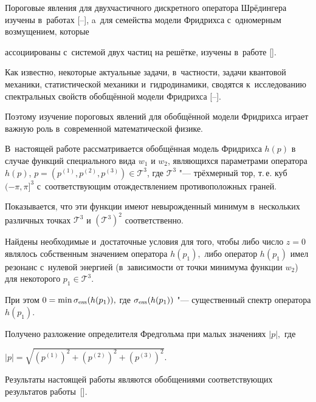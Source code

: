 \maketitle



Пороговые явления для двухчастичного дискретного оператора Шрё\-дин\-ге\-ра изучены в~работах [--], a~для семейства модели Фридрихса с~одномерным возмущением, которые

ассоциированы с~системой двух частиц на решётке, изучены в~работе []. 

Как известно, некоторые актуальные задачи, в~частности, задачи квантовой механики, статистической механики и~гидродинамики, сводятся к~исследованию спектральных свойств обобщённой модели Фридрихса [--].

Поэтому изучение пороговых явлений для обобщённой модели Фридрихса играет важную роль в~современной математической физике.





В~настоящей работе рассматривается обобщённая модель Фридрихса $h(p)$  в случае функций спе\-циаль\-но\-го вида $w_1$ и $w_2$, являющихся параметрами оператора $h(p)$, $p=(p^{(1)}, p^{(2)}, p^{(3)}) \in {\mathcal T}^3$, где ${\mathcal T}^3$ "--- трёхмерный тор, т.\,е. куб \mbox{$(-\pi, \pi]^3$}  с~соответствующим отождествлением противоположных граней.  

Показывается, что эти функции имеют невырожденный минимум в~нескольких различных точках ${\mathcal T}^3$ и $({\mathcal T}^3)^2$ соответственно. 

Найдены необходимые и~достаточные условия для того, чтобы либо число $z=0$ являлось собственным значением оператора $h(p_{1}),$ либо оператор $h(p_{1})$ имел резонанс с~нулевой энергией (в~зависимости от точки минимума функции $w_2$) для некоторого $p_1 \in {\mathcal T}^3.$ 

При этом \mbox{$0=\min \sigma_{\rm ess}(h(p_1)),$} где $\sigma_{\rm ess}(h(p_1))$ "--- существенный спектр оператора $h(p_{1})$.

Получено разложение определителя Фредгольма при малых значениях $|p|,$ где

$|p|=\sqrt{(p^{(1)})^2+(p^{(2)})^2+(p^{(3)})^2}.$ 

Результаты настоящей работы являются обобщениями соответствующих результатов работы~[]. 

